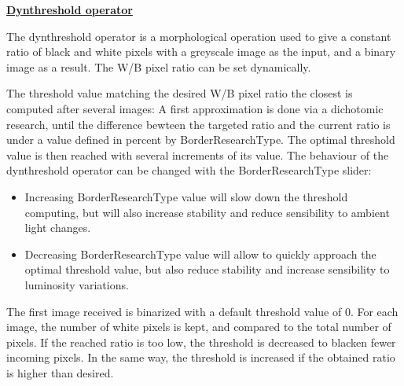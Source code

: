 \documentclass[12pt,a4paper]{article}
\begin{document}
\begin{center}
\textbf{\huge  \underline{Dynthreshold operator}}
\end{center}
\vspace{0.5cm}

The dynthreshold operator is a morphological operation used to give a constant ratio of black and white pixels with a greyscale image as the input, and a binary image as a result. The W/B pixel ratio can be set dynamically. \\

\begin{figure}[h!]
\centering
{}
\end{figure}

The threshold value matching the desired W/B pixel ratio the closest is computed after several images: A first approximation is done via a dichotomic research, until the difference bewteen the targeted ratio and the current ratio is under a value defined in percent by BorderResearchType. The optimal threshold value is then reached with several increments of its value. 
The behaviour of the dynthreshold operator can be changed with the BorderResearchType slider:
\begin{itemize}
\item Increasing BorderResearchType value will slow down the threshold computing, but will also increase stability and reduce sensibility to ambient light changes.
\item Decreasing BorderResearchType value will allow to quickly approach the optimal threshold value, but also reduce stability and increase sensibility to luminosity variations. 
\end{itemize}

The first image received is binarized with a default threshold value of 0. For each image, the number of white pixels is kept, and compared to the total number of pixels. If the reached ratio is too low, the threshold is decreased to blacken fewer incoming pixels. In the same way, the threshold is increased if the obtained ratio is higher than desired.
\vspace{0.5cm}
\end{document}
